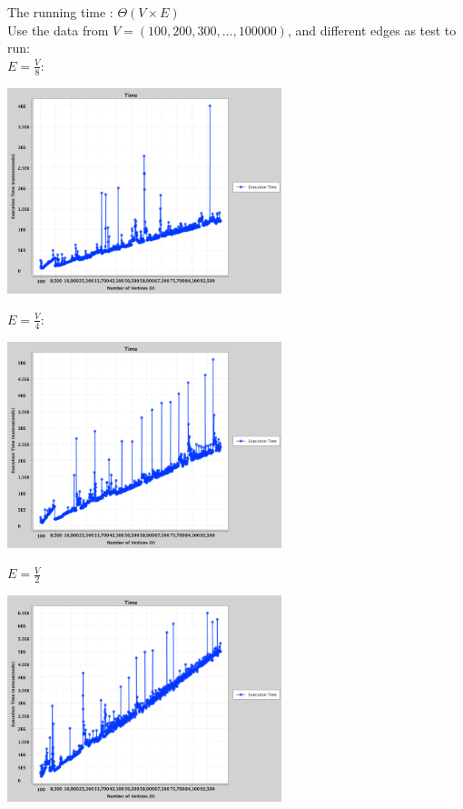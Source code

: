 \documentclass{article}
\begin{document}
\begin{enumerate}
    The running time : $\Theta(V \times E)$\\
    Use the data from $V = (100, 200, 300, ... , 100000)$, and different edges as test to run:\\
    $E = \frac{V}{8}$: 
                    \begin{center}
        \includegraphics[width=0.6\textwidth]{g1.png}
        \end{center}
    $E = \frac{V}{4}$: 
                    \begin{center}
        \includegraphics[width=0.6\textwidth]{g2.png}
        \end{center}
    $E = \frac{V}{2}$
                \begin{center}
        \includegraphics[width=0.6\textwidth]{g3.png}
        \end{center}

\end{enumerate}
\end{document}
